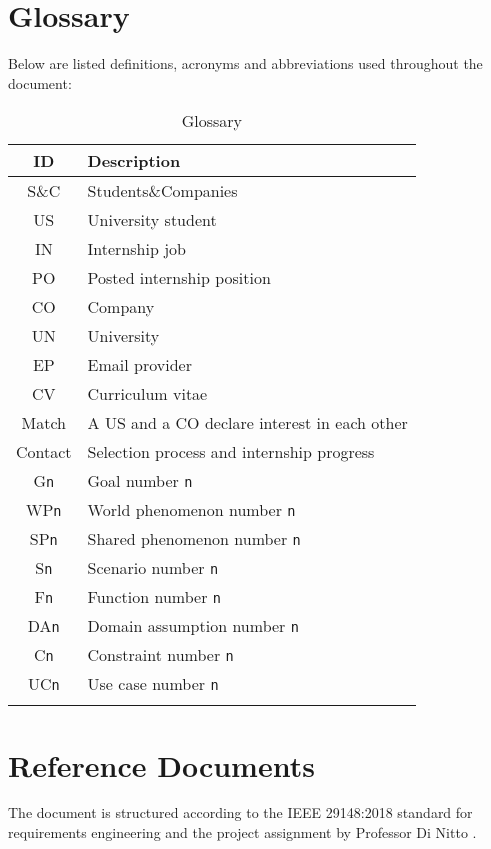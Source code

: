 \section{Glossary}
Below are listed definitions, acronyms and abbreviations used throughout the document:

\renewcommand{\arraystretch}{1.5}
\begin{longtable}{|c|p{8.5cm}|}
    \hline \rowcolor{polimiblue!40}
    \textbf{ID} & \textbf{Description} \\ \hline
    S\&C & Students\&Companies \\ \hline
    US & University student \\ \hline
    IN & Internship job \\ \hline
    PO & Posted internship position \\ \hline
    CO & Company \\ \hline
    UN & University \\ \hline
    EP & Email provider \\ \hline
    CV & Curriculum vitae \\ \hline
    Match & A US and a CO declare interest in each other \\ \hline
    Contact & Selection process and internship progress \\ \hline
    G\texttt{n} & Goal number \texttt{n} \\ \hline
    WP\texttt{n} & World phenomenon number \texttt{n} \\ \hline
    SP\texttt{n} & Shared phenomenon number \texttt{n} \\ \hline
    S\texttt{n} & Scenario number \texttt{n} \\ \hline
    F\texttt{n} & Function number \texttt{n} \\ \hline
    DA\texttt{n} & Domain assumption number \texttt{n} \\ \hline
    C\texttt{n} & Constraint number \texttt{n} \\ \hline
    UC\texttt{n} & Use case number \texttt{n} \\ \hline
\caption{Glossary}
\end{longtable}

\section{Reference Documents}
The document is structured according to the IEEE 29148:2018 standard for requirements engineering \cite{ieee2018} and the project assignment by Professor Di Nitto \cite{dinitto2024}.

